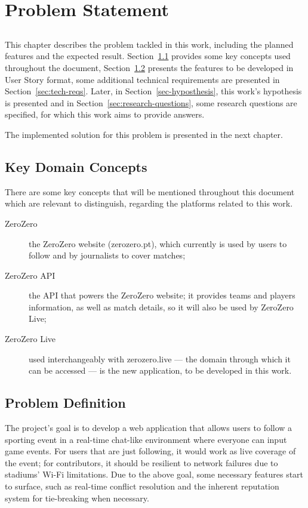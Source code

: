 \chapter{Problem Statement}\label{chap:problem}

\section*{}

This chapter describes the problem tackled in this work, including the planned features and the expected result. Section~\ref{sec:key-concepts} provides some key concepts used throughout the document, Section~\ref{sec:prob-def} presents the features to be developed in User Story format, some additional technical requirements are presented in Section~\ref{sec:tech-reqs}. Later, in Section~\ref{sec-hyposthesis}, this work's hypothesis is presented and in Section~\ref{sec:research-questions}, some research questions are specified, for which this work aims to provide answers.

The implemented solution for this problem is presented in the next chapter.  

\section{Key Domain Concepts}\label{sec:key-concepts}
There are some key concepts that will be mentioned throughout this document which are relevant to distinguish, regarding the platforms related to this work.
\begin{description}
    \item[ZeroZero] the ZeroZero website (zerozero.pt), which currently is used by users to follow and by journalists to cover matches;
    \item[ZeroZero API] the API that powers the ZeroZero website; it provides teams and players information, as well as match details, so it will also be used by ZeroZero Live;
    \item[ZeroZero Live] used interchangeably with zerozero.live --- the domain through which it can be accessed --- is the new application, to be developed in this work.
\end{description}

\section{Problem Definition}\label{sec:prob-def}

The project's goal is to develop a web application that allows users to follow a sporting event in a real-time chat-like environment where everyone can input game events. For users that are just following, it would work as live coverage of the event; for contributors, it should be resilient to network failures due to stadiums' Wi-Fi limitations.
Due to the above goal, some necessary features start to surface, such as real-time conflict resolution and the inherent reputation system for tie-breaking when necessary. 

